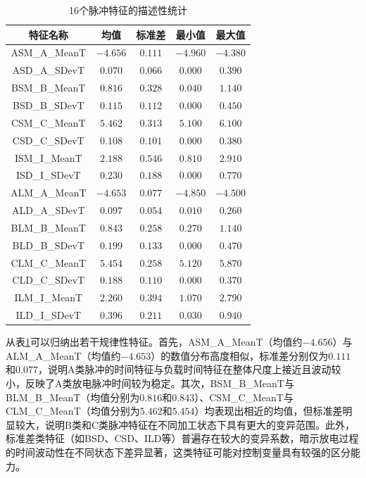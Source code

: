 \documentclass[UTF8,a4paper,12pt]{ctexart}
\begin{document}
\begin{table}[H]
\centering
\caption{16个脉冲特征的描述性统计}
\label{tab:descriptive}
\begin{tabular}{ccccc}
\toprule
特征名称 & 均值 & 标准差 & 最小值 & 最大值 \\
\midrule
ASM\_A\_MeanT & $-4.656$ & $0.111$ & $-4.960$ & $-4.380$ \\
ASD\_A\_SDevT & $0.070$ & $0.066$ & $0.000$ & $0.390$ \\
BSM\_B\_MeanT & $0.816$ & $0.328$ & $0.040$ & $1.140$ \\
BSD\_B\_SDevT & $0.115$ & $0.112$ & $0.000$ & $0.450$ \\
CSM\_C\_MeanT & $5.462$ & $0.313$ & $5.100$ & $6.100$ \\
CSD\_C\_SDevT & $0.108$ & $0.101$ & $0.000$ & $0.380$ \\
ISM\_I\_MeanT & $2.188$ & $0.546$ & $0.810$ & $2.910$ \\
ISD\_I\_SDevT & $0.230$ & $0.188$ & $0.000$ & $0.770$ \\
ALM\_A\_MeanT & $-4.653$ & $0.077$ & $-4.850$ & $-4.500$ \\
ALD\_A\_SDevT & $0.097$ & $0.054$ & $0.010$ & $0.260$ \\
BLM\_B\_MeanT & $0.843$ & $0.258$ & $0.270$ & $1.140$ \\
BLD\_B\_SDevT & $0.199$ & $0.133$ & $0.000$ & $0.470$ \\
CLM\_C\_MeanT & $5.454$ & $0.258$ & $5.120$ & $5.870$ \\
CLD\_C\_SDevT & $0.188$ & $0.110$ & $0.000$ & $0.370$ \\
ILM\_I\_MeanT & $2.260$ & $0.394$ & $1.070$ & $2.790$ \\
ILD\_I\_SDevT & $0.396$ & $0.211$ & $0.030$ & $0.940$ \\
\bottomrule
\end{tabular}
\end{table}

从表\ref{tab:descriptive}可以归纳出若干规律性特征。首先，ASM\_A\_MeanT（均值约$-4.656$）与ALM\_A\_MeanT（均值约$-4.653$）的数值分布高度相似，标准差分别仅为$0.111$和$0.077$，说明A类脉冲的时间特征与负载时间特征在整体尺度上接近且波动较小，反映了A类放电脉冲时间较为稳定。其次，BSM\_B\_MeanT与BLM\_B\_MeanT（均值分别为$0.816$和$0.843$）、CSM\_C\_MeanT与CLM\_C\_MeanT（均值分别为$5.462$和$5.454$）均表现出相近的均值，但标准差明显较大，说明B类和C类脉冲特征在不同加工状态下具有更大的变异范围。此外，标准差类特征（如BSD、CSD、ILD等）普遍存在较大的变异系数，暗示放电过程的时间波动性在不同状态下差异显著，这类特征可能对控制变量具有较强的区分能力。
\end{document}
